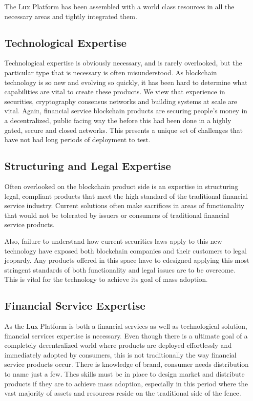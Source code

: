 \documentclass[11pt]{article}
\begin{document}
The Lux Platform has been assembled with a world class resources in all the necessary areas and tightly integrated them.


\subsection{Technological Expertise}

Technological expertise is obviously necessary, and is rarely overlooked, but the particular type that is necessary is often misunderstood. As blockchain technology is so new and evolving so quickly, it has been hard to determine what capabilities are vital to create these products. We view that experience in securities, cryptography consensus networks and building systems at scale are vital. Again, financial service blockchain products are securing people's money in a decentralized, public facing way the before this had been done in a highly gated, secure and closed networks. This presents a unique set of challenges that have not had long periods of deployment to test.


\subsection{Structuring and Legal Expertise}

Often overlooked on the blockchain product side is an expertise in structuring legal, compliant products that meet the high standard of the traditional financial service industry. Current solutions often make sacrifices in areas of functionality that would not be tolerated by issuers or consumers of traditional financial service products.


Also, failure to understand how current securities laws apply to this new technology have exposed both blockchain companies and their customers to legal jeopardy. Any products offered in this space have to cdesigned applying this most stringent standards of both functionality and legal issues are to be overcome. This is vital for the technology to achieve its goal of mass adoption.


\subsection{Financial Service Expertise}

As the Lux Platform is both a financial services as well as technological solution, financial services expertise is necessary. Even though there is a ultimate goal of a completely decentralized world where products are deployed effortlessly and immediately adopted by consumers, this is not traditionally the way financial service products occur. There is knowledge of brand, consumer needs distribution to name just a few. Thes skills must be in place to design market and distribute products if they are to achieve mass adoption, especially in this period where the vast majority of assets and resources reside on the traditional side of the fence.
\end{document}
